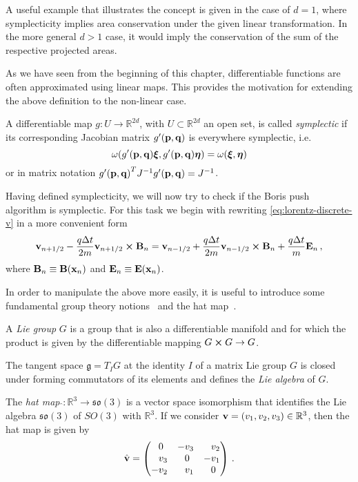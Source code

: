 \documentclass[12pt, class=report, crop=false]{standalone}
\begin{document}
A useful example that illustrates the concept is given in the case of \(d=1\),
where symplecticity implies area conservation under the given
linear transformation. In the more general \(d>1\) case, it would imply the conservation of the sum
of the respective projected areas.

As we have seen from the beginning of this chapter, differentiable
functions are often approximated using linear maps. This provides
the motivation for extending the above definition to the non-linear case.

\begin{definition}%
  \label{def:symplecticity-nonlinear}
  A differentiable map \(g:U \to \mathbb{R}^{2d}\), with \(U \subset \mathbb{R}^{2d}\) an open set, is called
  \emph{symplectic} if its corresponding Jacobian matrix \(g'(\vb{p},\vb{q})\) is everywhere symplectic, i.e.
  \[
  \omega(g'(\vb{p},\vb{q})\vb*{\xi}, g'(\vb{p},\vb{q})\vb*{\eta}) =
  \omega(\vb*{\xi},\vb*{\eta})
  \]
  or in matrix notation \({g'(\vb{p},\vb{q})}^T J^{-1} g'(\vb{p},\vb{q}) = J^{-1}\).
\end{definition}

Having defined symplecticity, we will now try to check if the Boris
push algorithm is symplectic. For this task we begin with rewriting
\cref{eq:lorentz-discrete-v} in a more convenient form
\[
\vb{v}_{n+1/2} - \frac{q \Delta t}{2m} \vb{v}_{n+1/2} \cp \vb{B}_n =
\vb{v}_{n-1/2} + \frac{q \Delta t}{2m} \vb{v}_{n-1/2} \cp \vb{B}_n
+ \frac{q \Delta t}{m} \vb{E}_n\,,
\]
where \(\vb{B}_n \equiv \vb{B}(\vb{x}_n)\) and
\(\vb{E}_n \equiv \vb{E}(\vb{x}_n)\).

In order to manipulate the above more easily, it is useful to introduce some fundamental group theory notions~\autocite[118]{hairer_geometricnumerical_2006} and the hat map~\autocite[289]{marsden_introductionmechanics_1999}.

\begin{definition}
  A \emph{Lie group} \(G\) is a group that is also a differentiable
  manifold and for which the product is given by the differentiable
  mapping \(G \cp G \to G\).
\end{definition}

The tangent space \(\mathfrak{g} = T_I G\) at the identity \(I\)
of a matrix Lie group \(G\) is closed under forming commutators
of its elements and defines the \emph{Lie algebra} of \(G\).

\begin{definition}
  The \emph{hat map} \(\hat{}: \mathbb{R}^3 \to \mathfrak{so}(3)\) is a
  vector space isomorphism that identifies the Lie algebra \(\mathfrak{so}(3)\)
  of \(SO(3)\) with \(\mathbb{R}^3\). If we consider
  \(\vb{v} = (v_1,v_2,v_3) \in \mathbb{R}^3\), then the hat map
  is given by
  \[
    \hat{\vb{v}} =
    \begin{pmatrix}
      \phantom{-}0\phantom{_1} & -v_3           & \phantom{-}v_2 \\
      \phantom{-}v_3 & \phantom{-}0\phantom{_1} &           -v_1 \\
            -v_2     & \phantom{-}v_1 &\phantom{-}0\phantom{_1}
    \end{pmatrix}\,.
  \]
\end{definition}
\end{document}
